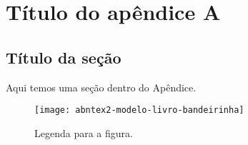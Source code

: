 \chapter{Título do apêndice A}\label{apendiceA}

\lipsum[50]

\section{Título da seção}

Aqui temos uma seção dentro do Apêndice.

\begin{figure}
    \begin{center}
        \texttt{[image: abntex2-modelo-livro-bandeirinha]}
        \caption{Legenda para a figura.}
        \label{rotulo1}
    \end{center}
\end{figure}